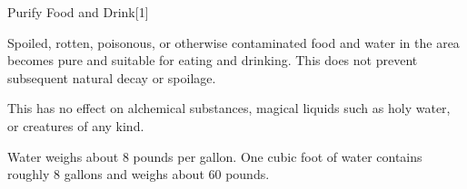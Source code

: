 \begin{spellsection}{Purify Food and Drink}[1]
    \begin{spellheader}
    \end{spellheader}
    \begin{spellcontent}
        \begin{spelltargetinginfo}
        \end{spelltargetinginfo}
        \begin{spelleffects}

            \spellline
            \spelleffect Spoiled, rotten, poisonous, or otherwise contaminated food and water in the area becomes pure and suitable for eating and drinking. This does not prevent subsequent natural decay or spoilage.
        \end{spelleffects}
    \end{spellcontent}
    \begin{spellfooter}
        \spellnotes This has no effect on alchemical substances, magical liquids such as holy water, or creatures of any kind.

        Water weighs about 8 pounds per gallon. One cubic foot of water contains roughly 8 gallons and weighs about 60 pounds.
    \end{spellfooter}
\end{spellsection}

